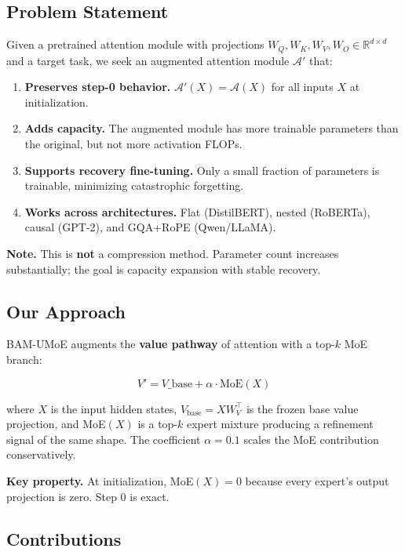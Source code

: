 \subsection{Problem Statement}

Given a pretrained attention module with projections 
$W_Q, W_K, W_V, W_O \in \mathbb{R}^{d \times d}$ and a target task, we seek 
an augmented attention module $\mathcal{A}'$ that:

\begin{enumerate}
\item \textbf{Preserves step-0 behavior.} $\mathcal{A}'(X) = \mathcal{A}(X)$ for
  all inputs $X$ at initialization.
\item \textbf{Adds capacity.} The augmented module has more trainable parameters
  than the original, but not more activation FLOPs.
\item \textbf{Supports recovery fine-tuning.} Only a small fraction of parameters
  is trainable, minimizing catastrophic forgetting.
\item \textbf{Works across architectures.} Flat (DistilBERT), nested (RoBERTa),
  causal (GPT-2), and GQA+RoPE (Qwen/LLaMA).

\end{enumerate}
\textbf{Note.} This is \textbf{not} a compression method. Parameter count increases 
substantially; the goal is capacity expansion with stable recovery.

\subsection{Our Approach}

BAM-UMoE augments the \textbf{value pathway} of attention with a top-$k$ MoE 
branch:

\[
V' = V\_{\text{base}} + \alpha \cdot \text{MoE}(X)
\]

where $X$ is the input hidden states, $V_\text{base} = X W_V^\top$ is the 
frozen base value projection, and MoE$(X)$ is a top-$k$ expert mixture 
producing a refinement signal of the same shape. The coefficient $\alpha = 0.1$ 
scales the MoE contribution conservatively.

\textbf{Key property.} At initialization, MoE$(X) = 0$ because every expert's 
output projection is zero. Step 0 is exact.

\subsection{Contributions}


